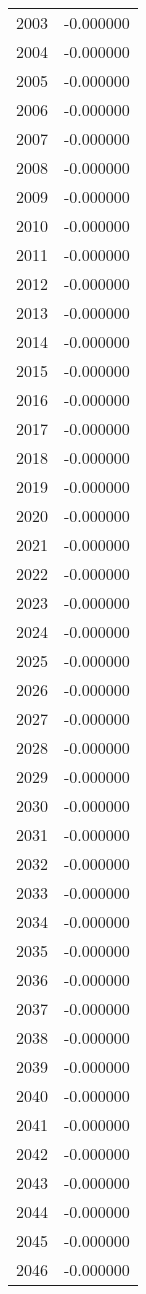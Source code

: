 \documentclass[12pt]{article}
\begin{document}
\begin{longtable}{@{}cc@{}}
2003 & -0.000000 \\
2004 & -0.000000 \\
2005 & -0.000000 \\
2006 & -0.000000 \\
2007 & -0.000000 \\
2008 & -0.000000 \\
2009 & -0.000000 \\
2010 & -0.000000 \\
2011 & -0.000000 \\
2012 & -0.000000 \\
2013 & -0.000000 \\
2014 & -0.000000 \\
2015 & -0.000000 \\
2016 & -0.000000 \\
2017 & -0.000000 \\
2018 & -0.000000 \\
2019 & -0.000000 \\
2020 & -0.000000 \\
2021 & -0.000000 \\
2022 & -0.000000 \\
2023 & -0.000000 \\
2024 & -0.000000 \\
2025 & -0.000000 \\
2026 & -0.000000 \\
2027 & -0.000000 \\
2028 & -0.000000 \\
2029 & -0.000000 \\
2030 & -0.000000 \\
2031 & -0.000000 \\
2032 & -0.000000 \\
2033 & -0.000000 \\
2034 & -0.000000 \\
2035 & -0.000000 \\
2036 & -0.000000 \\
2037 & -0.000000 \\
2038 & -0.000000 \\
2039 & -0.000000 \\
2040 & -0.000000 \\
2041 & -0.000000 \\
2042 & -0.000000 \\
2043 & -0.000000 \\
2044 & -0.000000 \\
2045 & -0.000000 \\
2046 & -0.000000 \\

\end{longtable}
\end{document}
